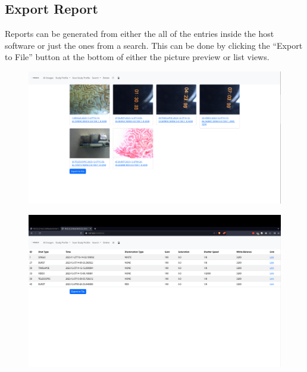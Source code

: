 \documentclass[12pt]{article}
\begin{document}
\begin{center}
	\subsection{Export Report}
	Reports can be generated from either the all of the entries inside the host software or just the ones from a search. This can be done by clicking the ``Export to File'' button at the bottom of either the picture preview or list views.
	\begin{figure}[H]
		\includegraphics[width=\textwidth]{Figures/Viewing-All-Captured-Media.png}
	\end{figure}
	\begin{figure}[H]
		\includegraphics[width=\textwidth]{Figures/List-View.png}
	\end{figure}
\end{center}
\end{document}
